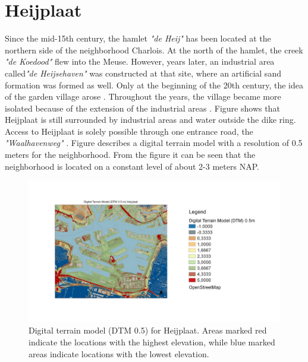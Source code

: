 \section{Heijplaat}
Since the mid-15th century, the hamlet \textit{"de Heij" }has been located at the northern side of the neighborhood Charlois. At the north of the hamlet, the creek \textit{"de Koedood" }flew into the Meuse. However, years later, an industrial area called\textit{"de Heijsehaven"} was constructed at that site, where an artificial sand formation was formed as well. Only at the beginning of the 20th century, the idea of the garden village arose  \cite{sebregts-2019}. Throughout the years, the village became more isolated because of the extension of the industrial areas \cite{port-of-rotterdam-2008}. Figure  shows that Heijplaat is still surrounded by industrial areas and water outside the dike ring. Access to Heijplaat is solely possible through one entrance road, the \textit{"Waalhavenweg"} \cite{milieudienst-rijnmond-2023}. Figure  describes a digital terrain model with a resolution of 0.5 meters for the neighborhood. From the figure it can be seen that the neighborhood is located on a constant level of about 2-3 meters NAP. 
\begin{figure}[htbp]
    \centering
    \includegraphics[width=0.80\linewidth]{figures/heij/ahnheijfig.pdf}
    \caption{Digital terrain model (DTM 0.5) for Heijplaat. Areas marked red indicate the locations with the highest elevation, while blue marked areas indicate locations with the lowest elevation.}
    \label{ahnheij}
\end{figure}\\
\\
